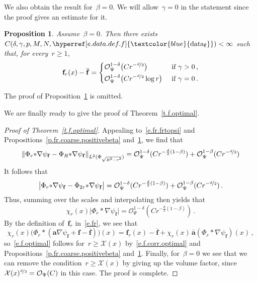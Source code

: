 \documentclass[11pt,twoside]{article} %
\numberwithin{equation}{section}
\newtheorem{proposition}[theorem]{Proposition}
\theoremstyle{definition}
\newcommand{\datareff}{\hyperref[e.data.def.f]{\textcolor{blue}{\ensuremath{\mathrm{data}_{\mathbf{f}}}}}}
\let\originalleft\left
\let\originalright\right
\renewcommand{\left}{\mathopen{}\mathclose\bgroup\originalleft}
\renewcommand{\right}{\aftergroup\egroup\originalright}
\newcommand{\f}{\mathbf{f}}
\renewcommand{\a}{\mathbf{a}}
\newcommand{\ahom}{\bar{\a}}
\newcommand{\X}{\mathcal{X}}
\renewcommand{\O}{\mathcal{O}}
\newcommand{\minscale}{\chi}
\begin{document}
We also obtain the result for~$\beta=0$. We will allow~$\gamma=0$ in the statement since the proof gives an estimate for it. 

\begin{proposition}
\label{p.fr.coarse.zerobeta}
Assume~$\beta=0$. Then there exists~$C(\delta,\gamma,p,M,N,\datareff) < \infty$ such that, for every~$r \geq 1$, 
\begin{equation}
\label{e.fr.coarse.zerobeta}
\f_r(x) - \overline{\f} 
=
\left\{
\begin{aligned}
& \O_{\Psi}^{1-\delta} \bigl(C r^{-\nicefrac d2}\bigr) & & \mbox{ if } \gamma>0
\, ,  
\\
& 
 \O_{\Psi}^{1-\delta} \bigl(C r^{-\nicefrac d2} \log r\bigr) & & \mbox{ if } \gamma = 0
\, .
\end{aligned}
\right.
\end{equation}
\end{proposition}

The proof of Proposition~\ref{p.fr.coarse.zerobeta} is omitted. 

\smallskip

We are finally ready to give the proof of Theorem~\ref{t.f.optimal}. 


\begin{proof}[Proof of Theorem~\ref{t.f.optimal}]
Appealing to~\eqref{e.fr.frtopsi} and Propositions~\ref{p.fr.coarse.positivebeta} and~\ref{p.fr.coarse.zerobeta}, we find that
\begin{equation*}  
\left\| \Phi_r {\ast}  \nabla \psi_{\f}  - \Phi_R {\ast} \nabla \psi_{\f}  \right\|_{L^2 ( \Phi_{\sqrt{R^2-r^2}})}
= \O_{\Psi}^{1-\delta}(C r^{-\frac d2(1-\beta)}) + \O_{\Psi}^{1-\beta}(C r^{-\nicefrac d2})
\end{equation*}
It follows that 
\begin{equation*}  
\bigl| \Phi_r {\ast}  \nabla \psi_{\f}   - \Phi_{2r} {\ast}  \nabla \psi_{\f}  \bigr|
= 
\O_{\Psi}^{1-\delta}(C r^{-\frac d2(1-\beta)}) + \O_{\Psi}^{1-\beta}(C r^{-\nicefrac d2})\,.
\end{equation*}
Thus, summing over the scales and interpolating then yields that 
\begin{equation}  \label{e.f.corr.optimal}
\minscale_r(x)  \bigl| \Phi_r {\ast}  \nabla \psi_{\f}   \bigr| 
= 
\O_{\Psi}^{1-\delta}(C r^{-\frac d2(1-\beta)}) 
\,.
\end{equation}
By the definition of~$\f_r$ in~\eqref{e.fr}, we see that 
\begin{equation*}  
\minscale_r(x) \bigl( \Phi_r \ast (\a \nabla \psi_{\f} + \f - \overline{\f})\bigr) (x)
=
\f_r(x) -  \overline{\f} + \minscale_r(x) \, \ahom (\Phi_r \ast  \nabla \psi_{\f})(x)
\,,
\end{equation*}
so~\eqref{e.f.optimal} follows for~$r\geq \X(x)$ by~\eqref{e.f.corr.optimal} and Propositions~\ref{p.fr.coarse.positivebeta} and~\ref{p.fr.coarse.zerobeta}. Finally, for~$\beta = 0$ we see that we can remove the condition~$r\geq \X(x)$ by giving up the volume factor, since~$\X(x)^{\nicefrac d2} = \O_\Psi(C)$ in this case. The proof is complete. 
\end{proof}
\end{document}
